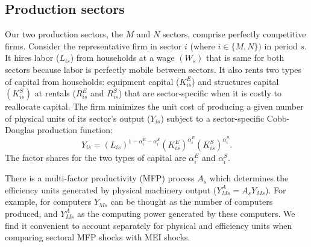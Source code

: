 \documentclass[12pt,fleqn]{article}
\begin{document}
\subsection{\protect\normalsize Production sectors}

{\normalsize Our two production sectors, the $M$ and $N$ sectors, comprise perfectly competitive firms. Consider the
representative firm in sector $i$ (where $i\in \{M,N\})$ in period $s$. It
hires labor ($L_{is}$) from households at a wage $\left( W_{s}\right) $ that
is same for both sectors because labor is perfectly mobile between sectors.
It also rents two types of capital from households: equipment capital ($%
K_{is}^{E}$) and structures capital $\left( K_{is}^{S}\right) $ at rentals ($%
R_{is}^{E}$ and $R_{is}^{S}$) that are sector-specific when it is costly
to reallocate capital. The firm minimizes the unit cost of producing a given
number of physical units of its sector's output ($Y_{is}$) subject to a
sector-specific Cobb-Douglas production function:
\begin{equation}
Y_{is}=\left( L_{is}\right) ^{1-\alpha _{i}^{E}-\alpha _{i}^{S}}\left(
K_{is}^{E}\right) ^{\alpha _{i}^{E}}\left( K_{is}^{S}\right) ^{\alpha
_{i}^{S}}.  \label{technology}
\end{equation}%
The factor shares for the two types of capital are $\alpha _{i}^{E}$ and $%
\alpha _{i}^{S}$. }

{\normalsize
}

{\normalsize There is a multi-factor productivity (MFP) process $A_s $ which
determines the efficiency units generated by physical machinery output ($%
Y_{Ms}^{A}=A_s Y_{Ms}$).
For example, for computers $Y_{Ms}$ can be thought
as the number of computers produced, and $Y_{Ms}^{A}$ as the computing power
generated by these computers. We find it convenient to account separately
for physical and efficiency units when comparing sectoral MFP shocks with
MEI shocks. }
\end{document}
